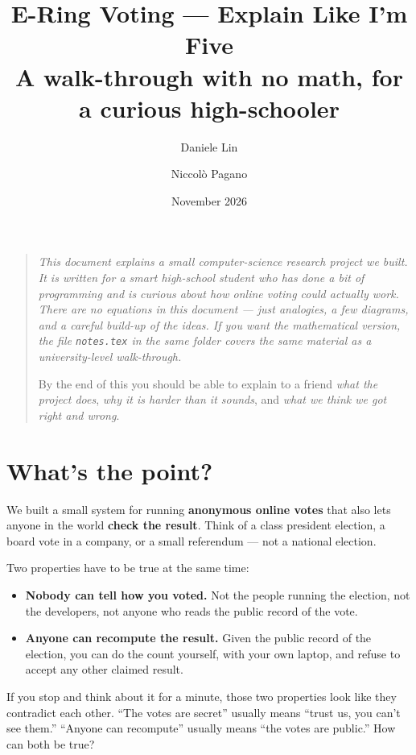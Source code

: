 \documentclass[11pt,a4paper]{article}
\title{\textbf{E-Ring Voting --- Explain Like I'm Five}\\[0.4em]
       \large A walk-through with no math, for a curious high-schooler}
\author{Daniele Lin \and Niccol\`o Pagano}
\date{November 2026}
\begin{document}
\maketitle

\begin{quote}
\itshape
This document explains a small computer-science research project we
built. It is written for a smart high-school student who has done a bit
of programming and is curious about how online voting could actually
work. There are no equations in this document --- just analogies, a
few diagrams, and a careful build-up of the ideas. If you want the
mathematical version, the file \texttt{notes.tex} in the same folder
covers the same material as a university-level walk-through.

By the end of this you should be able to explain to a friend
\emph{what the project does}, \emph{why it is harder than it sounds},
and \emph{what we think we got right and wrong}.
\end{quote}

\tableofcontents

\section{What's the point?}

We built a small system for running \textbf{anonymous online votes}
that also lets anyone in the world \textbf{check the result}. Think of
a class president election, a board vote in a company, or a small
referendum --- not a national election.

Two properties have to be true at the same time:

\begin{itemize}[leftmargin=*]
  \item \textbf{Nobody can tell how you voted.} Not the people running
        the election, not the developers, not anyone who reads the
        public record of the vote.
  \item \textbf{Anyone can recompute the result.} Given the public
        record of the election, you can do the count yourself, with
        your own laptop, and refuse to accept any other claimed result.
\end{itemize}

If you stop and think about it for a minute, those two properties look
like they contradict each other. ``The votes are secret'' usually
means ``trust us, you can't see them.'' ``Anyone can recompute''
usually means ``the votes are public.'' How can both be true?
\end{document}
